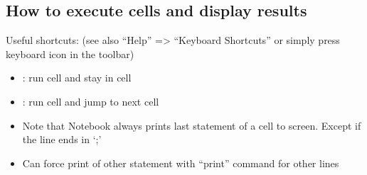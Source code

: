\documentclass[letterpaper,10pt,english]{jupyterBook}
\begin{document}
\subsection{How to execute cells and display results}
\label{\detokenize{content/Python/Intro_Jupyter_notebook:how-to-execute-cells-and-display-results}}
\sphinxAtStartPar
Useful shortcuts: (see also “Help” => “Keyboard Shortcuts” or simply press keyboard icon in the toolbar)
\begin{itemize}
\item {} 
\sphinxAtStartPar
{}: run cell and stay in cell

\item {} 
\sphinxAtStartPar
{}: run cell and jump to next cell

\item {} 
\sphinxAtStartPar
Note that Notebook always prints last statement of a cell to screen. Except if the line ends in ‘;’

\item {} 
\sphinxAtStartPar
Can force print of other statement with “print” command for other lines

\end{itemize}
\end{document}
